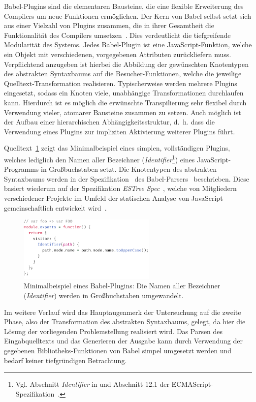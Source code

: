 Babel-Plugins sind die elementaren Bausteine, die eine flexible Erweiterung des Compilers um neue Funktionen ermöglichen. Der Kern von Babel selbst setzt sich aus einer Vielzahl von Plugins zusammen, die in ihrer Gesamtheit die Funktionalität des Compilers umsetzen~\autocite{BABEL}. Dies verdeutlicht die tiefgreifende Modularität des Systems. Jedes Babel-Plugin ist eine JavaScript-Funktion, welche ein Objekt mit verschiedenen, vorgegebenen Attributen zurückliefern muss. Verpflichtend anzugeben ist hierbei die Abbildung der gewünschten Knotentypen des abstrakten Syntaxbaums auf die Besucher-Funktionen, welche die jeweilige Quelltext-Transformation realisieren. Typischerweise werden mehrere Plugins eingesetzt, sodass ein Knoten viele, unabhängige Transformationen durchlaufen kann. Hierdurch ist es möglich die erwünschte Transpilierung sehr flexibel durch Verwendung vieler, atomarer Bausteine zusammen zu setzen. Auch möglich ist der Aufbau einer hierarchischen Abhängigkeitsstruktur, d.~h. dass die Verwendung eines Plugins zur impliziten Aktivierung weiterer Plugins führt.

Quelltext~\ref{code:babel-plugin-definition} zeigt das Minimalbeispiel eines simplen, vollständigen Plugins, welches lediglich den Namen aller Bezeichner (\textit{Identifier}\footnote{Vgl. Abschnitt \textit{Identifier} in \autocite{BABEL:PARSER_SPEC} und Abschnitt 12.1 der ECMAScript-Spezifikation~\autocite[187\psqq]{ECMASCRIPT:2019}.}) eines JavaScript-Programms in Großbuchstaben setzt. Die Knotentypen des abstrakten Syntaxbaums werden in der Spezifikation~\autocite{BABEL:PARSER_SPEC} des Babel-Parsers~\autocite{BABEL:PARSER} beschrieben. Diese basiert wiederum auf der Spezifikation \textit{ESTree Spec}~\autocite{ESTREE_SPEC}, welche von Mitgliedern verschiedener Projekte im Umfeld der statischen Analyse von JavaScript gemeinschaftlich entwickelt wird~\autocite{BABEL:PARSER,ESTREE_SPEC}.

\medskip
\begin{figure}[htb]
  \includegraphics[width=0.6\textwidth]{src/2_Grundlagen/fig/minimal-babel-plugin.pdf}
  \caption[Minimalbeispiel eines Babel-Plugins]{Minimalbeispiel eines Babel-Plugins: Die Namen aller Bezeichner (\textit{Identifier}) werden in Großbuchstaben umgewandelt.}
  \label{code:babel-plugin-definition}
\end{figure}


Im weitere Verlauf wird das Hauptaugenmerk der Untersuchung auf die zweite Phase, also der Transformation des abstrakten Syntaxbaums, gelegt, da hier die Lösung der vorliegenden Problemstellung realisiert wird. Das Parsen des Eingabquelltexts und das Generieren der Ausgabe kann durch Verwendung der gegebenen Bibliotheks-Funktionen von Babel simpel umgesetzt werden und bedarf keiner tiefgründigen Betrachtung.

